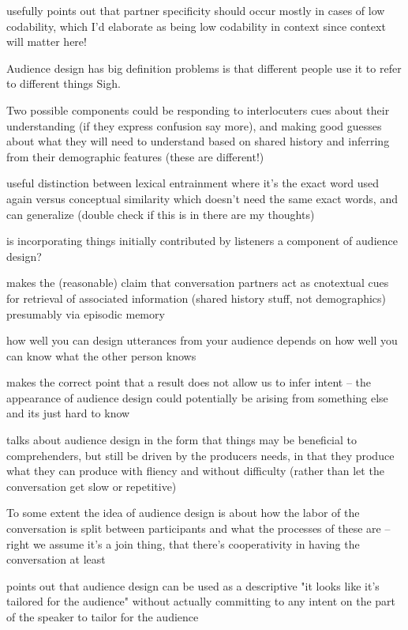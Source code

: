 \documentclass[]{article}
\begin{document}
\cite{horton2002a} usefully points out that partner specificity should occur mostly in cases of low codability, which I'd elaborate as being low codability in context since context will matter here!

Audience design has big definition problems is that different people use it to refer to different things Sigh. 

Two possible components could be  responding to interlocuters cues about their understanding (if they express confusion say more), and making good guesses about what they will need to understand based on shared history and inferring from their demographic features (these are different!) 

\cite{horton2002a} useful distinction between lexical entrainment where it's the exact word used again versus conceptual similarity which doesn't need the same exact words, and can generalize (double check if this is in there are my thoughts) 

is incorporating things initially contributed by listeners a component of audience design? 

\cite{horton2005} makes the (reasonable) claim that conversation partners act as cnotextual cues for retrieval of associated information (shared history stuff, not demographics) presumably via episodic memory 

\cite{horton2005} how well you can design utterances from your audience depends on how well you can know what the other person knows

\cite{horton1996} makes the correct point that a result does not allow us to infer intent -- the appearance of audience design could potentially be arising from something else and its just hard to know

\cite{macdonald2013} talks about audience design in the form that things may be beneficial to comprehenders, but still be driven by the producers needs, in that they produce what they can produce with fliency and without difficulty (rather than let the conversation get slow or repetitive) 

To some extent the idea of audience design is about how the labor of the conversation is split between participants and what the processes of these are -- right we assume it's a join thing, that there's cooperativity in having the conversation at least 

\cite{rogers2013} points out that audience design can be used as a descriptive "it looks like it's tailored for the audience" without actually committing to any intent on the part of the speaker to tailor for the audience 
\end{document}

